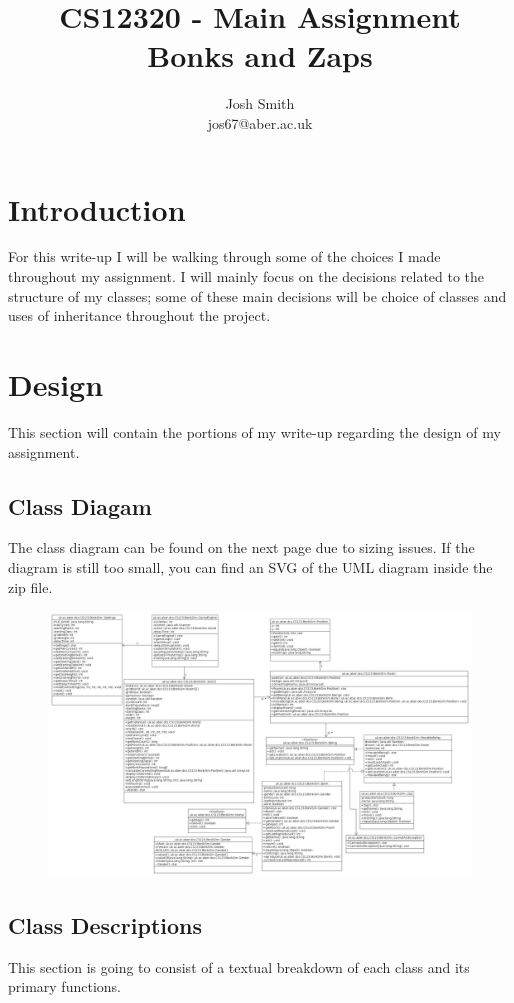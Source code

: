 \documentclass[12pt]{article}
\title{\textbf{CS12320 - Main Assignment\\
				Bonks and Zaps}}
\author{Josh Smith\\
		jos67@aber.ac.uk}
\date{}
\begin{document}
\maketitle
\newpage

\tableofcontents

\newpage


\section{Introduction}
For this write-up I will be walking through some of the choices I made throughout my assignment. I will mainly focus on the decisions related to the structure of my classes; some of these main decisions will be choice of classes and uses of inheritance throughout the project.

\section{Design}
This section will contain the portions of my write-up regarding the design of my assignment.

\subsection{Class Diagam}
The class diagram can be found on the next page due to sizing issues. If the diagram is still too small, you can find an SVG of the UML diagram inside the zip file.
\begin{figure}[hpc]
	\includegraphics[width=\paperwidth,angle=90]{UML}
\end{figure}
\newpage
\subsection{Class Descriptions}
This section is going to consist of a textual breakdown of each class and its primary functions.
\end{document}
